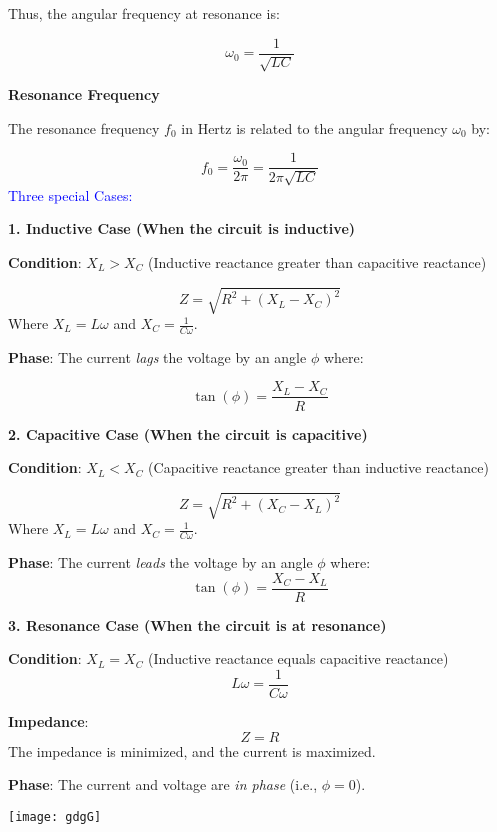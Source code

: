 \documentclass{beamer}
\begin{document}
\begin{frame}

Thus, the angular frequency at resonance is:

\[
\omega_0 = \frac{1}{\sqrt{LC}}
\]

\textbf{Resonance Frequency}

The resonance frequency \( f_0 \) in Hertz is related to the angular frequency \( \omega_0 \) by:

\[
f_0 = \frac{\omega_0}{2 \pi} = \frac{1}{2 \pi \sqrt{LC}}
\]
\textcolor{blue}{Three special Cases:}

\textbf{1. Inductive Case (When the circuit is inductive)}

\textbf{Condition}: \( X_L > X_C \) (Inductive reactance greater than capacitive reactance)

\[
Z = \sqrt{R^2 + \left( X_L - X_C \right)^2}
\]
Where \( X_L = L \omega \) and \( X_C = \frac{1}{C \omega} \).

\textbf{Phase}: The current \textit{lags} the voltage by an angle \( \phi \) where:
\end{frame}


\begin{frame}

\[
\tan(\phi) = \frac{X_L - X_C}{R}
\]

\textbf{2. Capacitive Case (When the circuit is capacitive)}

\textbf{Condition}: \( X_L < X_C \) (Capacitive reactance greater than inductive reactance)

\[
Z = \sqrt{R^2 + \left( X_C - X_L \right)^2}
\]
Where \( X_L = L \omega \) and \( X_C = \frac{1}{C \omega} \).

\textbf{Phase}: The current \textit{leads} the voltage by an angle \( \phi \) where:
\[
\tan(\phi) = \frac{X_C - X_L}{R}
\]

\textbf{3. Resonance Case (When the circuit is at resonance)}

\textbf{Condition}: \( X_L = X_C \) (Inductive reactance equals capacitive reactance)
\[
L \omega = \frac{1}{C \omega}
\]
\end{frame}


\begin{frame}
\textbf{Impedance}: 
\[
Z = R
\]
The impedance is minimized, and the current is maximized.

\textbf{Phase}: The current and voltage are \textit{in phase} (i.e., \( \phi = 0 \)).
\begin{center}
\texttt{[image: gdgG]}
\end{center}

\end{frame}
\end{document}
